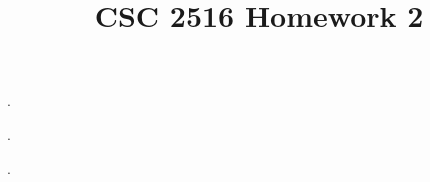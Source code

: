 \documentclass{myhw}
\title{CSC 2516 Homework 2}
\begin{document}
\begin{homeworkProblem}
.
\begin{homeworkSection}
\end{homeworkSection}
\begin{homeworkSection}
\end{homeworkSection}
\begin{homeworkSection}
\end{homeworkSection}
\end{homeworkProblem}


\begin{homeworkProblem}
.
\begin{homeworkSection}
\end{homeworkSection}
\begin{homeworkSection}
\end{homeworkSection}
\begin{homeworkSection}
\end{homeworkSection}
\end{homeworkProblem}


\begin{homeworkProblem}
.
\begin{homeworkSection}
\end{homeworkSection}
\begin{homeworkSection}
\end{homeworkSection}
\begin{homeworkSection}
\end{homeworkSection}
\end{homeworkProblem}
\end{document}

